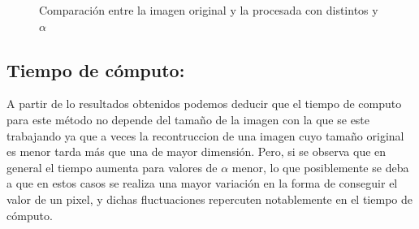 \documentclass[a4paper]{article}
\begin{document}
\begin{figure}[H]
\centering
{}
\caption{Comparación entre la imagen original y la procesada con distintos y $\alpha$}
\end{figure}

\subsection{Tiempo de cómputo:}
A partir de lo resultados obtenidos podemos deducir que el tiempo de computo para este método no depende del tamaño de la imagen con la que se este trabajando ya que a veces la recontruccion de una imagen cuyo tamaño original es menor tarda más que una de mayor dimensi\'on. Pero, si se observa que en general el tiempo aumenta para valores de $\alpha$ menor, lo que posiblemente se deba a que en estos casos se realiza una mayor variación en la forma de conseguir el valor de un pixel, y dichas fluctuaciones repercuten notablemente en el tiempo de cómputo. 
\end{document}
